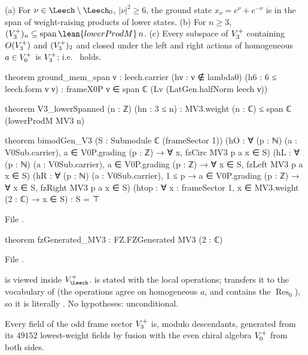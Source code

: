 \begin{theorem}\label{ch14:thm:bimodgen}
(a) For $\nu\in\Leech\setminus\Leech_0$, $|\nu|^2\ge6$, the ground state $x_\nu=e^\nu+e^{-\nu}$ is in the span of
weight-raising products of lower states.  (b) For $n\ge3$, $(\chXIVB)_n\subseteq\operatorname{span}\lean{lowerProdM}\,n$.
(c) Every subspace of $V_3^{+}$ containing $O(V_3^{+})$ and $(V_3^{+})_2$ and closed under the left and right
actions of homogeneous $a\in V_0^{+}$ is $V_3^{+}$; i.e.\  holds.
\end{theorem}
\begin{leancode}
theorem ground_mem_span {ν : leech.carrier} (hν : ν ∉ lambda0) (h6 : 6 ≤ leech.form ν ν) :
    frameX0P ν ∈ span ℂ (Lv (LatGen.halfNorm leech ν))

theorem V3_lowerSpanned (n : ℤ) (hn : 3 ≤ n) :
    MV3.weight (n : ℂ) ≤ span ℂ (lowerProdM MV3 n)

theorem bimodGen_V3 (S : Submodule ℂ (frameSector 1))
    (hO : ∀ (p : ℕ) (a : V0Sub.carrier), a ∈ V0P.grading (p : ℤ) → ∀ x, fzCirc MV3 p a x ∈ S)
    (hL : ∀ (p : ℕ) (a : V0Sub.carrier), a ∈ V0P.grading (p : ℤ) → ∀ x ∈ S, fzLeft MV3 p a x ∈ S)
    (hR : ∀ (p : ℕ) (a : V0Sub.carrier), 1 ≤ p → a ∈ V0P.grading (p : ℤ) → ∀ x ∈ S,
      fzRight MV3 p a x ∈ S)
    (htop : ∀ x : frameSector 1, x ∈ MV3.weight (2 : ℂ) → x ∈ S) : S = ⊤
\end{leancode}
File .
\begin{leancode}
theorem fzGenerated_MV3 : FZ.FZGenerated MV3 (2 : ℂ)
\end{leancode}
File .

\begin{dictionary}
 is  viewed inside $V_\Leech^+$.   is stated with the local
operations;  transfers it to the vocabulary of  (the operations agree
on homogeneous $a$, and  contains the $\operatorname{Res}_0$), so it is literally .
No hypotheses: unconditional.
\end{dictionary}

\begin{physics}
Every field of the odd frame sector $V_3^{+}$ is, modulo descendants, generated from its
$49152$ lowest-weight fields by fusion with the even chiral algebra $V_0^{+}$ from both sides.
\end{physics}

